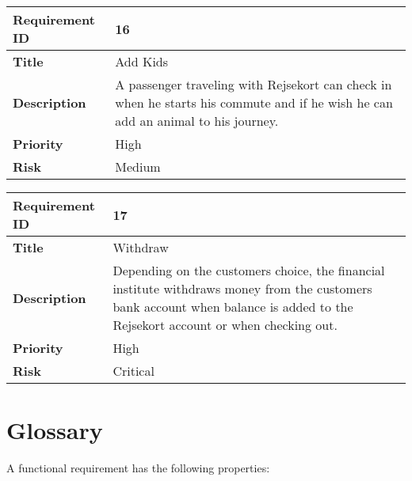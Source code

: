 \begin{center}
	\def\arraystretch{1.5}%
    \begin{tabular}{ | p{5cm} | p{5cm} |}
    \hline
    	\textbf{Requirement ID} & 16 \\ \hline
		\textbf{Title} & Add Kids\\ \hline
		\textbf{Description} & A passenger traveling with Rejsekort can check in when he starts his commute and if he wish he can add an animal to his journey.\\ \hline
		\textbf{Priority} & High\\ \hline
		\textbf{Risk} & Medium\\
      \hline
    \end{tabular}
\end{center}

\begin{center}
	\def\arraystretch{1.5}%
    \begin{tabular}{ | p{5cm} | p{5cm} |}
    \hline
    	\textbf{Requirement ID} & 17 \\ \hline
		\textbf{Title} & Withdraw\\ \hline
		\textbf{Description} & Depending on the customers choice, the financial institute withdraws money from the customers bank account when balance is added to the Rejsekort account or when checking out.\\ \hline
		\textbf{Priority} & High\\ \hline
		\textbf{Risk} & Critical\\
      \hline
    \end{tabular}
\end{center}

\section*{Glossary}

A functional requirement has the following properties:

